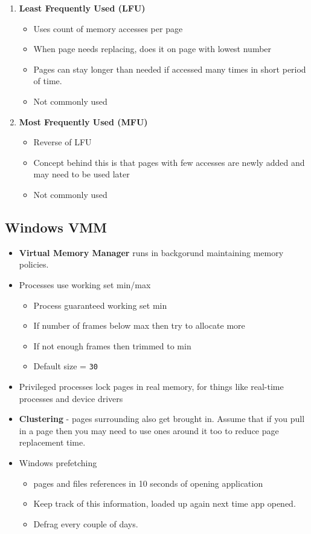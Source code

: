 \documentclass{article}
\begin{document}
\begin{enumerate}
			\item \textbf{Least Frequently Used (LFU)}
			\begin{itemize}
				\item Uses count of memory accesses per page
				\item When page needs replacing, does it on page with lowest number
				\item Pages can stay longer than needed if accessed many times in short period of time.
				\item Not commonly used
			\end{itemize}
			
			\item \textbf{Most Frequently Used (MFU)}
			\begin{itemize}
				\item Reverse of LFU
				\item Concept behind this is that pages with few accesses are newly added and may need to be used later
				\item Not commonly used
			\end{itemize}
		\end{enumerate}

	\subsection{Windows VMM}
		\begin{itemize}
			\item \textbf{Virtual Memory Manager} runs in backgorund maintaining memory policies.
			
			\item Processes use working set min/max
			\begin{itemize}
				\item Process guaranteed working set min
				\item If number of frames below max then try to allocate more
				\item If not enough frames then trimmed to min
				\item Default size = \texttt{30}
			\end{itemize}
			
			\item Privileged processes lock pages in real memory, for things like real-time processes and device drivers
			
			\item \textbf{Clustering} - pages surrounding also get brought in. Assume that if you pull in a page then you may need to use ones around it too to reduce page replacement time.
			
			\item Windows prefetching
			\begin{itemize}
				\item pages and files references in 10 seconds of opening application
				\item Keep track of this information, loaded up again next time app opened.
				\item Defrag every couple of days.
			\end{itemize}
		\end{itemize}
		
\end{document}
